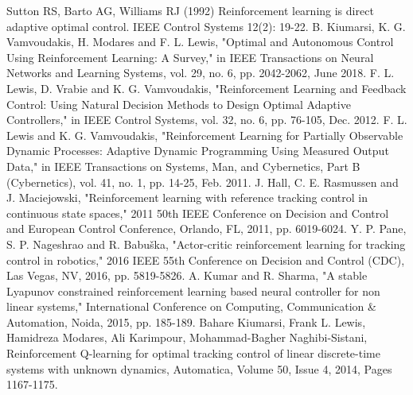 \documentclass[conference]{IEEEtran}
\begin{document}
\begin{thebibliography}{00}
 Sutton RS, Barto AG, Williams RJ (1992) Reinforcement learning is
direct adaptive optimal control. IEEE Control Systems 12(2): 19-22.
 B. Kiumarsi, K. G. Vamvoudakis, H. Modares and F. L. Lewis, "Optimal and Autonomous Control Using Reinforcement Learning: A Survey," in IEEE Transactions on Neural Networks and Learning Systems, vol. 29, no. 6, pp. 2042-2062, June 2018.
 F. L. Lewis, D. Vrabie and K. G. Vamvoudakis, "Reinforcement Learning and Feedback Control: Using Natural Decision Methods to Design Optimal Adaptive Controllers," in IEEE Control Systems, vol. 32, no. 6, pp. 76-105, Dec. 2012.
 F. L. Lewis and K. G. Vamvoudakis, "Reinforcement Learning for Partially Observable Dynamic Processes: Adaptive Dynamic Programming Using Measured Output Data," in IEEE Transactions on Systems, Man, and Cybernetics, Part B (Cybernetics), vol. 41, no. 1, pp. 14-25, Feb. 2011.
 J. Hall, C. E. Rasmussen and J. Maciejowski, "Reinforcement learning with reference tracking control in continuous state spaces," 2011 50th IEEE Conference on Decision and Control and European Control Conference, Orlando, FL, 2011, pp. 6019-6024.
 Y. P. Pane, S. P. Nageshrao and R. Babuška, "Actor-critic reinforcement learning for tracking control in robotics," 2016 IEEE 55th Conference on Decision and Control (CDC), Las Vegas, NV, 2016, pp. 5819-5826.
 A. Kumar and R. Sharma, "A stable Lyapunov constrained reinforcement learning based neural controller for non linear systems," International Conference on Computing, Communication \& Automation, Noida, 2015, pp. 185-189.
 Bahare Kiumarsi, Frank L. Lewis, Hamidreza Modares, Ali Karimpour, Mohammad-Bagher Naghibi-Sistani,
Reinforcement Q-learning for optimal tracking control of linear discrete-time systems with unknown dynamics,
Automatica,
Volume 50, Issue 4,
2014,
Pages 1167-1175.

\end{thebibliography}
\end{document}
